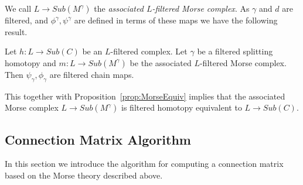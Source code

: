 We call $L\to Sub(M^\gamma)$ the {\em associated $L$-filtered Morse complex}.  As $\gamma$ and $d$ are filtered, and $\phi^\gamma,\psi^\gamma$ are defined in terms of these maps we have the following result.
\begin{prop}
Let $h:L\to Sub(C)$ be an $L$-filtered complex.  Let $\gamma$ be a filtered splitting homotopy and $m:L\to Sub(M^\gamma)$ be the associated $L$-filtered Morse complex.   Then $\psi_\gamma,\phi_\gamma$ are filtered chain maps.
\end{prop}

This together with Proposition~\ref{prop:MorseEquiv} implies that the associated Morse complex $L\to Sub(M^\gamma)$ is filtered homotopy equivalent to $L\to Sub(C)$.

%
%
%
%
%
%
%
%


\subsection{Connection Matrix Algorithm}

In this section we introduce the algorithm for computing a connection matrix based on the Morse theory described above.


